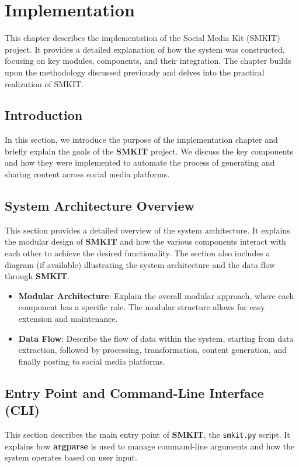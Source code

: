 
\chapter{Implementation}
\label{chp:implementation}
This chapter describes the implementation of the Social Media Kit (SMKIT) project. It provides a detailed explanation of how the system was constructed, focusing on key modules, components, and their integration. The chapter builds upon the methodology discussed previously and delves into the practical realization of SMKIT.

\section{Introduction}
\label{sec:implementation_introduction}
In this section, we introduce the purpose of the implementation chapter and briefly explain the goals of the \textbf{SMKIT} project. We discuss the key components and how they were implemented to automate the process of generating and sharing content across social media platforms.

\section{System Architecture Overview}
\label{sec:system_architecture_overview}
This section provides a detailed overview of the system architecture. It explains the modular design of \textbf{SMKIT} and how the various components interact with each other to achieve the desired functionality. The section also includes a diagram (if available) illustrating the system architecture and the data flow through \textbf{SMKIT}.

\begin{itemize}
    \item \textbf{Modular Architecture}: Explain the overall modular approach, where each component has a specific role. The modular structure allows for easy extension and maintenance.
    \item \textbf{Data Flow}: Describe the flow of data within the system, starting from data extraction, followed by processing, transformation, content generation, and finally posting to social media platforms.
\end{itemize}

\section{Entry Point and Command-Line Interface (CLI)}
\label{sec:entry_point_and_command_line_interface_cli}
This section describes the main entry point of \textbf{SMKIT}, the \texttt{smkit.py} script. It explains how \textbf{argparse} is used to manage command-line arguments and how the system operates based on user input.

